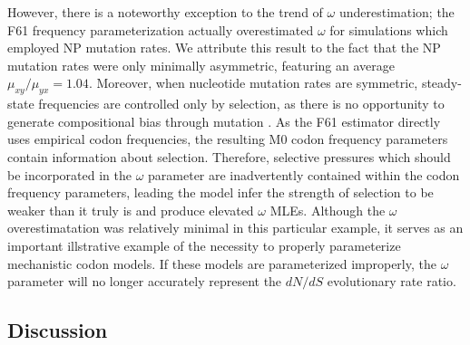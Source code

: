 \documentclass[11pt]{article}
\begin{document}
However, there is a noteworthy exception to the trend of $\omega$ underestimation; the F61 frequency parameterization actually overestimated $\omega$ for simulations which employed NP mutation rates. We attribute this result to the fact that the NP mutation rates were only minimally asymmetric, featuring an average $\mu_{xy}/\mu_{yx} = 1.04$. Moreover, when nucleotide mutation rates are symmetric, steady-state frequencies are controlled only by selection, as there is no opportunity to generate compositional bias through mutation \cite{SellaHirsh2005}. As the F61 estimator directly uses empirical codon frequencies, the resulting M0 codon frequency parameters contain information about selection. Therefore, selective pressures which should be incorporated in the $\omega$ parameter are inadvertently contained within the codon frequency parameters, leading the model infer the strength of selection to be weaker than it truly is and produce elevated $\omega$ MLEs. Although the $\omega$ overestimatation was relatively minimal in this particular example, it serves as an important illstrative example of the necessity to properly parameterize mechanistic codon models. If these models are parameterized improperly, the $\omega$ parameter will no longer accurately represent the $dN/dS$ evolutionary rate ratio.



\subsection*{Discussion}

\end{document}
